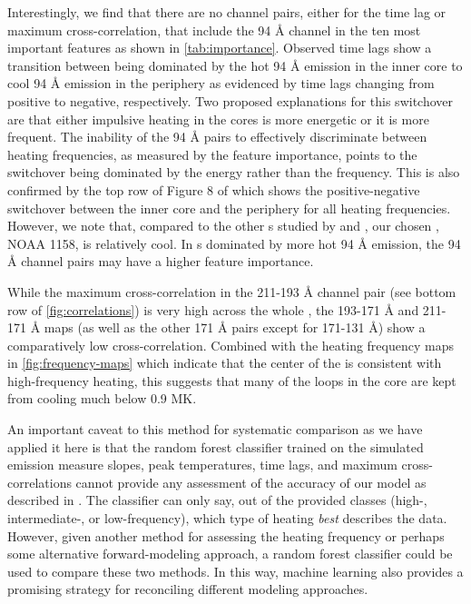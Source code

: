 Interestingly, we find that there are no channel pairs, either for the time lag or maximum cross-correlation, that include the 94 \AA{} channel in the ten most important features as shown in \autoref{tab:importance}.    
Observed time lags \citep{viall_evidence_2012,viall_survey_2017} show a transition between being dominated by the hot 94 \AA{} emission in the inner core to cool 94 \AA{}  emission in the periphery as evidenced by time lags changing from positive to negative, respectively.
Two proposed explanations for this switchover are that either impulsive heating in the cores is more energetic or it is more frequent.
The inability of the 94 \AA{} pairs to effectively discriminate between heating frequencies, as measured by the feature importance, points to the switchover being dominated by the energy rather than the frequency.
This is also confirmed by the top row of Figure 8 of  which shows the positive-negative switchover between the inner core and the periphery for all heating frequencies.
However, we note that, compared to the other \AR s studied by \citet{warren_systematic_2012} and , our chosen \AR{}, NOAA 1158, is relatively cool.
In \AR s dominated by more hot 94 \AA{} emission, the 94 \AA{} channel pairs may have a higher feature importance.

While the maximum cross-correlation in the 211-193 \AA{} channel pair (see bottom row of \autoref{fig:correlations}) is very high across the whole \AR{}, the 193-171 \AA{} and 211-171 \AA{} maps (as well as the other 171 \AA{} pairs except for 171-131 \AA{}) show a comparatively low cross-correlation.
Combined with the heating frequency maps in \autoref{fig:frequency-maps} which indicate that the center of the \AR{} is consistent with high-frequency heating, this suggests that many of the loops in the core are kept from cooling much below 0.9 MK.

An important caveat to this method for systematic comparison as we have applied it here is that the random forest classifier trained on the simulated emission measure slopes, peak temperatures, time lags, and maximum cross-correlations cannot provide any assessment of the accuracy of our model as described in .
The classifier can only say, out of the provided classes (high-, intermediate-, or low-frequency), which type of heating \textit{best} describes the data.
However, given another method for assessing the heating frequency or perhaps some alternative forward-modeling approach, a random forest classifier could be used to compare these two methods.
In this way, machine learning also provides a promising strategy for reconciling different modeling approaches.
